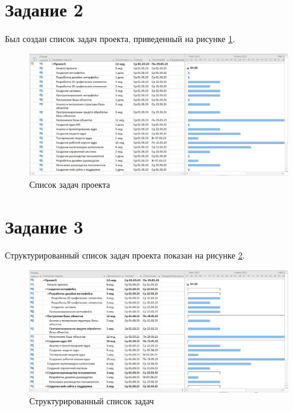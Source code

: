 \section*{Задание 2}

Был создан список задач проекта, приведенный на рисунке \ref{img:task2}.

\begin{figure}[H]
	\begin{center}
		\includegraphics[scale=0.5]{inc/img/task2.jpg}
	\end{center}
	\captionsetup{justification=centering}
	\caption{Список задач проекта}
	\label{img:task2}
\end{figure}

\section*{Задание 3}

Структурированный список задач проекта показан на рисунке \ref{img:task3}.

\begin{figure}[H]
	\begin{center}
		\includegraphics[scale=0.5]{inc/img/task3.jpg}
	\end{center}
	\captionsetup{justification=centering}
	\caption{Структурированный список задач}
	\label{img:task3}
\end{figure}

